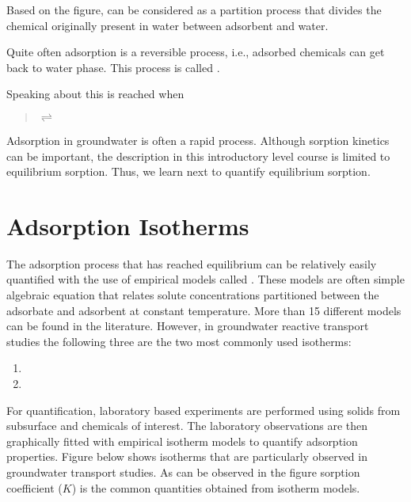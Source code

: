 \documentclass[letterpaper,10pt,english]{jupyterBook}
\begin{document}
\sphinxAtStartPar
Based on the figure,  can be considered as a partition process that divides the chemical originally present in water between adsorbent and water.

\sphinxAtStartPar
Quite often adsorption is a reversible process, i.e., adsorbed chemicals can get back to water phase. This process is called .

\sphinxAtStartPar
Speaking about  this is reached when
\begin{quote}

\sphinxAtStartPar
{}  \(\rightleftharpoons \) 
\end{quote}

\sphinxAtStartPar
Adsorption in groundwater is often a rapid process. Although sorption kinetics can be important, the description in this introductory level course is limited to equilibrium sorption. Thus, we learn next to quantify equilibrium sorption.


\section{Adsorption Isotherms}
\label{\detokenize{content/transport/L10/22_reactive_transport:adsorption-isotherms}}
\sphinxAtStartPar
The adsorption process that has reached equilibrium can be relatively easily quantified with the use of empirical models called . These models are often simple algebraic equation that relates solute concentrations partitioned between the adsorbate and adsorbent at constant temperature. More than 15 different  models can be found in the literature. However, in groundwater reactive transport studies the following three are the two most commonly used isotherms:
\begin{enumerate}
%
\item {} 
\sphinxAtStartPar
{} 

\item {} 
\sphinxAtStartPar
{}

\end{enumerate}

\sphinxAtStartPar
For quantification, laboratory based experiments are performed using solids from subsurface and chemicals of interest. The laboratory observations are then graphically fitted with empirical isotherm models to quantify adsorption properties. Figure below shows isotherms that are particularly observed in groundwater transport studies. As can be observed in the figure sorption coefficient (\(K\)) is the common quantities obtained from isotherm models.
\end{document}
